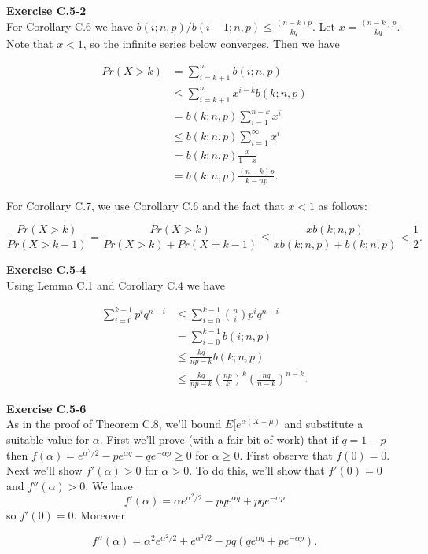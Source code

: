 \documentclass{article}
\begin{document}
\noindent\textbf{Exercise C.5-2}\\

For Corollary C.6 we have $b(i;n,p)/b(i-1;n,p) \leq \frac{(n-k)p}{kq}$.  Let $x = \frac{(n-k)p}{kq}$.  Note that $x < 1$, so the infinite series below converges. Then we have

\begin{align*}
Pr(X > k) &= \sum_{i=k+1}^n b(i;n,p) \\
&\leq \sum_{i=k+1}^n x^{i-k}b(k;n,p) \\
&= b(k;n,p) \sum_{i=1}^{n-k} x^i \\
&\leq b(k;n,p) \sum_{i=1}^\infty x^i \\
&= b(k;n,p) \frac{x}{1-x} \\
&= b(k;n,p) \frac{(n-k)p}{k-np}.
\end{align*}

For Corollary C.7, we use Corollary C.6 and the fact that $x < 1$ as follows:

\[ \frac{Pr(X > k)}{Pr(X>k-1)} = \frac{Pr(X>k)}{Pr(X>k)+Pr(X=k-1)} \leq \frac{xb(k;n,p)}{xb(k;n,p) + b(k;n,p)}  < \frac{1}{2}.\]

\noindent\textbf{Exercise C.5-4}\\

Using Lemma C.1 and Corollary C.4 we have 

\begin{align*} 
\sum_{i=0}^{k-1} p^iq^{n-i} &\leq \sum_{i=0}^{k-1} {n \choose i}p^iq^{n-i} \\
&= \sum_{i=0}^{k-1}b(i;n,p) \\
&\leq \frac{kq}{np-k}b(k;n,p) \\
&\leq \frac{kq}{np-k}\left(\frac{np}{k}\right)^k \left(\frac{nq}{n-k}\right)^{n-k}.
\end{align*}

\noindent\textbf{Exercise C.5-6}\\

As in the proof of Theorem C.8, we'll bound $E[e^{\alpha(X-\mu)}$ and substitute a suitable value for $\alpha$.  First we'll prove (with a fair bit of work) that if $q = 1-p$ then $f(\alpha) = e^{\alpha^2/2} - pe^{\alpha q} - qe^{-\alpha p} \geq 0$ for $\alpha \geq 0$.  First observe that $f(0) = 0$.  Next we'll show $f'(\alpha) > 0$ for $\alpha > 0$.  To do this, we'll show that $f'(0) = 0$ and $f''(\alpha) > 0$.  We have
\[f'(\alpha) = \alpha e^{\alpha^2/2} - pqe^{\alpha q} + pqe^{-\alpha p} \]
so $f'(0) = 0$.  Moreover

\[ f''(\alpha) = \alpha^2e^{\alpha^2/2} + e^{\alpha^2/2} - pq(qe^{\alpha q} + pe^{-\alpha p}).\]
\end{document}
